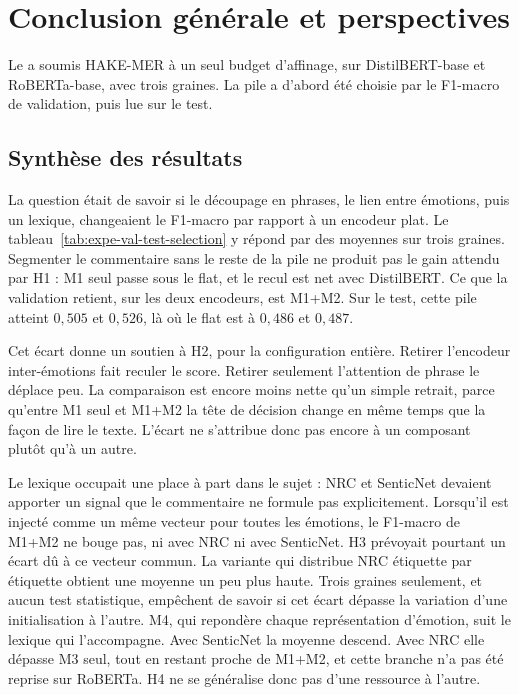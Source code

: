 \chapter*{Conclusion générale et perspectives}

Le  a soumis HAKE-MER à un seul budget
d'affinage, sur DistilBERT-base et RoBERTa-base, avec trois graines. La
pile a d'abord été choisie par le F1-macro de validation, puis lue sur
le test.

\section*{Synthèse des résultats}
La question était de savoir si le découpage en phrases, le lien entre
émotions, puis un lexique, changeaient le F1-macro par rapport à un
encodeur plat. Le tableau~\ref{tab:expe-val-test-selection} y répond par
des moyennes sur trois graines. Segmenter le commentaire sans le reste
de la pile ne produit pas le gain attendu par H1 : M1 seul passe sous
le flat, et le recul est net avec DistilBERT. Ce que la validation
retient, sur les deux encodeurs, est M1+M2. Sur le test, cette pile
atteint $0{,}505$ et $0{,}526$, là où le flat est à $0{,}486$ et
$0{,}487$.

Cet écart donne un soutien à H2, pour la configuration entière. Retirer
l'encodeur inter-émotions fait reculer le score. Retirer seulement
l'attention de phrase le déplace peu. La comparaison est encore moins
nette qu'un simple retrait, parce qu'entre M1 seul et M1+M2 la tête de
décision change en même temps que la façon de lire le texte. L'écart
ne s'attribue donc pas encore à un composant plutôt qu'à un autre.

Le lexique occupait une place à part dans le sujet : NRC et SenticNet
devaient apporter un signal que le commentaire ne formule pas
explicitement. Lorsqu'il est injecté comme un même vecteur pour toutes
les émotions, le F1-macro de M1+M2 ne bouge pas, ni avec NRC ni avec
SenticNet. H3 prévoyait pourtant un écart dû à ce vecteur commun. La
variante qui distribue NRC étiquette par étiquette obtient une moyenne
un peu plus haute. Trois graines seulement, et aucun test statistique,
empêchent de savoir si cet écart dépasse la variation d'une
initialisation à l'autre. M4, qui repondère chaque
représentation d'émotion, suit le lexique qui l'accompagne. Avec
SenticNet la moyenne descend. Avec NRC elle dépasse M3 seul, tout en
restant proche de M1+M2, et cette branche n'a pas été reprise sur
RoBERTa. H4 ne se généralise donc pas d'une ressource à l'autre.

